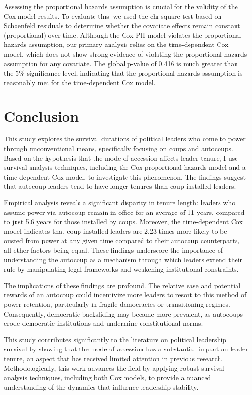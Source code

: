 \documentclass[
  12pt,
]{article}
\begin{document}
Assessing the proportional hazards assumption is crucial for the
validity of the Cox model results. To evaluate this, we used the
chi-square test based on Schoenfeld residuals to determine whether the
covariate effects remain constant (proportional) over time. Although the
Cox PH model violates the proportional hazards assumption, our primary
analysis relies on the time-dependent Cox model, which does not show
strong evidence of violating the proportional hazards assumption for any
covariate. The global p-value of 0.416 is much greater than the 5\%
significance level, indicating that the proportional hazards assumption
is reasonably met for the time-dependent Cox model.

\section{Conclusion}\label{conclusion}

This study explores the survival durations of political leaders who come
to power through unconventional means, specifically focusing on coups
and autocoups. Based on the hypothesis that the mode of accession
affects leader tenure, I use survival analysis techniques, including the
Cox proportional hazards model and a time-dependent Cox model, to
investigate this phenomenon. The findings suggest that autocoup leaders
tend to have longer tenures than coup-installed leaders.

Empirical analysis reveals a significant disparity in tenure length:
leaders who assume power via autocoup remain in office for an average of
11 years, compared to just 5.6 years for those installed by coups.
Moreover, the time-dependent Cox model indicates that coup-installed
leaders are 2.23 times more likely to be ousted from power at any given
time compared to their autocoup counterparts, all other factors being
equal. These findings underscore the importance of understanding the
autocoup as a mechanism through which leaders extend their rule by
manipulating legal frameworks and weakening institutional constraints.

The implications of these findings are profound. The relative ease and
potential rewards of an autocoup could incentivize more leaders to
resort to this method of power retention, particularly in fragile
democracies or transitioning regimes. Consequently, democratic
backsliding may become more prevalent, as autocoups erode democratic
institutions and undermine constitutional norms.

This study contributes significantly to the literature on political
leadership survival by showing that the mode of accession has a
substantial impact on leader tenure, an aspect that has received limited
attention in previous research. Methodologically, this work advances the
field by applying robust survival analysis techniques, including both
Cox models, to provide a nuanced understanding of the dynamics that
influence leadership stability.
\end{document}
